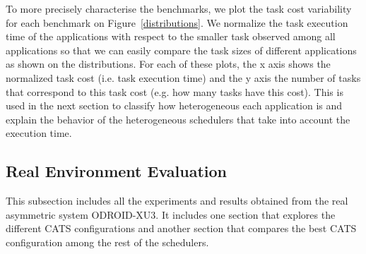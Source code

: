To more precisely characterise the benchmarks, we plot the task cost variability for each benchmark on Figure~\ref{distributions}.
We normalize the task execution time of the applications with respect to the smaller task observed among all applications so that we can easily compare the task sizes of different applications as shown on the distributions.
For each of these plots, the x axis shows the normalized task cost (i.e. task execution time) and the y axis the number of tasks that correspond to this task cost (e.g. how many tasks have this cost).
This is used in the next section to classify how heterogeneous each application is and explain the behavior of the heterogeneous schedulers that take into account the execution time.



%	

\subsection{Real Environment Evaluation}
This subsection includes all the experiments and results obtained from the real asymmetric system ODROID-XU3.
It includes one section that explores the different CATS configurations and another section that compares the best CATS configuration among the rest of the schedulers.

